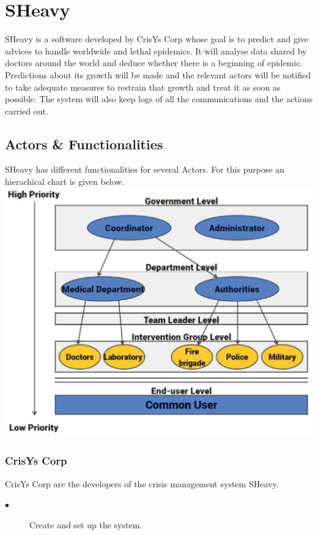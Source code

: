 \section{SHeavy}
SHeavy is a software developed by CrisYs Corp whose goal is to predict and
give advices to handle worldwide and lethal epidemics. It will analyse data
shared by doctors around the world and deduce whether there is a beginning of
epidemic. Predictions about its growth will be made and the relevant actors will
be notified to take adequate measures to restrain that growth and treat it as
soon as possible. The system will also keep logs of all the communications and
the actions carried out.\\

\subsection{Actors \& Functionalities}
SHeavy has different functionalities for several Actors. For this purpose an
hierachical chart is given below.\\

\includegraphics{images/ActorLevels.eps} \\

\subsubsection{CrisYs Corp}
CrisYs Corp are the developers of the crisis management system SHeavy.\\
\begin{description}
 \item[$\bullet$] Create and set up the system.
\end{description} 

